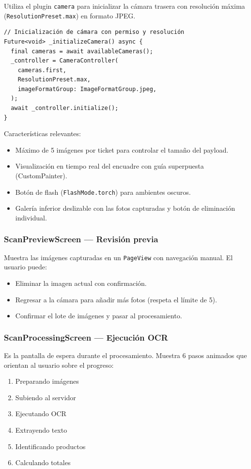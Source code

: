 \documentclass[12pt, letterpaper]{article}
\newcommand{\campo}[1]{\texttt{#1}}
\begin{document}
Utiliza el plugin \campo{camera} para inicializar la cámara trasera con
resolución máxima (\campo{ResolutionPreset.max}) en formato JPEG.

\begin{lstlisting}
// Inicialización de cámara con permiso y resolución
Future<void> _initializeCamera() async {
  final cameras = await availableCameras();
  _controller = CameraController(
    cameras.first,
    ResolutionPreset.max,
    imageFormatGroup: ImageFormatGroup.jpeg,
  );
  await _controller.initialize();
}
\end{lstlisting}

Características relevantes:
\begin{itemize}
  \item Máximo de 5 imágenes por ticket para controlar el tamaño del payload.
  \item Visualización en tiempo real del encuadre con guía superpuesta
        (CustomPainter).
  \item Botón de flash (\campo{FlashMode.torch}) para ambientes oscuros.
  \item Galería inferior deslizable con las fotos capturadas y botón de
        eliminación individual.
\end{itemize}

\subsubsection{ScanPreviewScreen — Revisión previa}

Muestra las imágenes capturadas en un \campo{PageView} con navegación
manual. El usuario puede:

\begin{itemize}
  \item Eliminar la imagen actual con confirmación.
  \item Regresar a la cámara para añadir más fotos (respeta el límite de 5).
  \item Confirmar el lote de imágenes y pasar al procesamiento.
\end{itemize}

\subsubsection{ScanProcessingScreen — Ejecución OCR}

Es la pantalla de espera durante el procesamiento. Muestra 6 pasos animados
que orientan al usuario sobre el progreso:

\begin{enumerate}[label=\arabic*.]
  \item Preparando imágenes
  \item Subiendo al servidor
  \item Ejecutando OCR
  \item Extrayendo texto
  \item Identificando productos
  \item Calculando totales
\end{enumerate}
\end{document}
